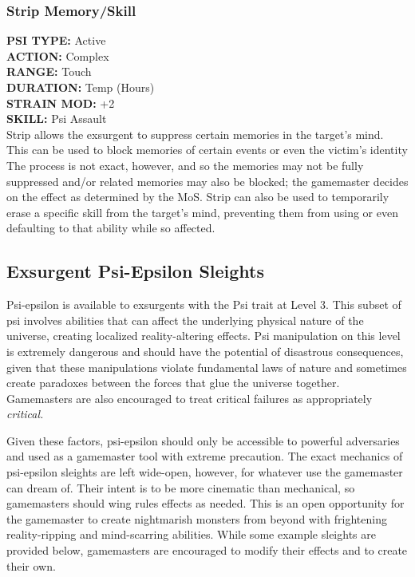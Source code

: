 \subsubsection{Strip Memory/Skill }
\textbf{PSI TYPE:} Active \\
\textbf{ACTION:} Complex \\
\textbf{RANGE:} Touch \\
\textbf{DURATION:} Temp (Hours) \\
\textbf{STRAIN MOD:} +2 \\
\textbf{SKILL:} Psi Assault \\
Strip allows the exsurgent to suppress certain memories
in the target's mind. This can be used to block
memories of certain events or even the victim's identity
The process is not exact, however, and so the
memories may not be fully suppressed and/or related 
memories may also be blocked; the gamemaster decides
on the effect as determined by the MoS. Strip can
also be used to temporarily erase a specific skill from 
the target's mind, preventing them from using or even 
defaulting to that ability while so affected.



\subsection{Exsurgent Psi-Epsilon Sleights }

Psi-epsilon is available to exsurgents with the Psi trait 
at Level 3. This subset of psi involves abilities that can 
affect the underlying physical nature of the universe, 
creating localized reality-altering effects. Psi manipulation
on this level is extremely dangerous and should
have the potential of disastrous consequences, given 
that these manipulations violate fundamental laws of 
nature and sometimes create paradoxes between the 
forces that glue the universe together. Gamemasters 
are also encouraged to treat critical failures as appropriately
\textit{critical.}

Given these factors, psi-epsilon should only be 
accessible to powerful adversaries and used as a 
gamemaster tool with extreme precaution. The exact 
mechanics of psi-epsilon sleights are left wide-open, 
however, for whatever use the gamemaster can 
dream of. Their intent is to be more cinematic than 
mechanical, so gamemasters should wing rules effects 
as needed. This is an open opportunity for the gamemaster
to create nightmarish monsters from beyond
with frightening reality-ripping and mind-scarring 
abilities. While some example sleights are provided 
below, gamemasters are encouraged to modify their 
effects and to create their own. 

